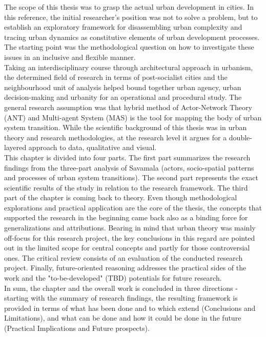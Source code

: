\documentclass[11pt]{report}
\begin{document}
{The scope of this thesis was to grasp the actual urban development  in cities.
In this reference, the initial researcher's position was not to solve a problem, but to establish an exploratory framework for disassembling urban complexity and tracing urban dynamics as constitutive elements of urban development processes.
The starting point was the methodological question on how to investigate these issues in an inclusive and flexible manner.
\\

Taking an interdisciplinary course through architectural approach in urbanism, the determined field of research in terms of post-socialist cities and the neighbourhood unit of analysis helped bound together urban agency, urban decision-making and urbanity for an operational and procedural study.
The general research assumption was that hybrid method of Actor-Network Theory (ANT) and Multi-agent System (MAS) is the tool for mapping the body of urban system transition.
While the scientific background of this thesis was in urban theory and research methodologies, at the research level it argues for a double-layered approach to data, qualitative and visual.  
\\

This chapter is divided into four parts. 
The first part summarizes the research findings from the three-part analysis of Savamala (actors, socio-spatial patterns and processes of urban system transitions).
The second part represents the exact scientific results of the study in relation to the research framework.
The third part of the chapter is coming back to theory.
Even though methodological explorations and practical application are the core of the thesis, the concepts that supported the research in the beginning came back also as a binding force for generalizations and attributions.
Bearing in mind that urban theory was mainly off-focus for this research project, the key conclusions in this regard are pointed out in the limited scope for central concepts and partly for those controversial ones.
The critical review consists of an evaluation of the conducted research project.
Finally, future-oriented reasoning addresses the practical sides of the work and the "to-be-developed" (TBD) potentials for future research.
\\

In sum, the chapter and the overall work is concluded in three directions - starting with the summary of research findings, the resulting framework is provided 
in terms of what has been done and to which extend (Conclusions and Limitations), and what can be done and how it could be done in the future (Practical Implications and Future prospects).

}
\end{document}

